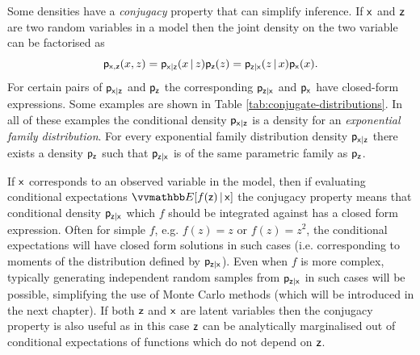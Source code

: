 Some densities have a \emph{conjugacy} property that can simplify inference. If $\mathsf{x}$ and $\mathsf{z}$ are two random variables in a model then the joint density on the two variable can be factorised as
\begin{equation}\label{eq:conjugate-factorisation}
  \mathsf{p}_{\mathsf{x},\mathsf{z}}(x,z) =
  \mathsf{p}_{\mathsf{x}|\mathsf{z}}(x\operatorname{|} z)\mathsf{p}_{\mathsf{z}}(z) =
  \mathsf{p}_{\mathsf{z}|\mathsf{x}}(z\operatorname{|} x)\mathsf{p}_{\mathsf{x}}(x).
\end{equation}
For certain pairs of $\mathsf{p}_{\mathsf{x}|\mathsf{z}}$ and $\mathsf{p}_{\mathsf{z}}$ the corresponding $\mathsf{p}_{\mathsf{z}|\mathsf{x}}$ and $\mathsf{p}_{\mathsf{x}}$ have closed-form expressions. Some examples are shown in Table \ref{tab:conjugate-distributions}. In all of these examples the conditional density $\mathsf{p}_{\mathsf{x}|\mathsf{z}}$ is a density for an \emph{exponential family distribution}. For every exponential family distribution density $\mathsf{p}_{\mathsf{x}|\mathsf{z}}$ there exists a density $\mathsf{p}_{\mathsf{z}}$ such that $\mathsf{p}_{\mathsf{z}|\mathsf{x}}$ is of the same parametric family as $\mathsf{p}_{\mathsf{z}}$.

If $\mathsf{x}$ corresponds to an observed variable in the model, then if evaluating conditional expectations $\expc{f(\rvar{z}) \gvn \rvar{x}}$ the conjugacy property means that conditional density $\mathsf{p}_{\mathsf{z}|\mathsf{x}}$ which $f$ should be integrated against has a closed form expression. Often for simple $f$, e.g. $f(z) = z$ or $f(z) = z^2$, the conditional expectations will have closed form solutions in such cases (i.e. corresponding to moments of the distribution defined by $\mathsf{p}_{\mathsf{z}|\mathsf{x}}$). Even when $f$ is more complex, typically generating independent random samples from $\mathsf{p}_{\mathsf{z}|\mathsf{x}}$ in such cases will be possible, simplifying the use of Monte Carlo methods (which will be introduced in the next chapter). If both $\mathsf{z}$ and $\mathsf{x}$ are latent variables then the conjugacy property is also useful as in this case $\mathsf{z}$ can be analytically marginalised out of conditional expectations of functions which do not depend on $\mathsf{z}$.

